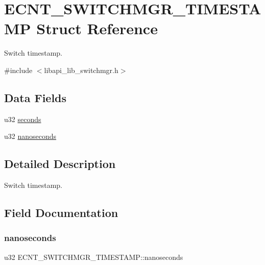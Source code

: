 \hypertarget{structECNT__SWITCHMGR__TIMESTAMP}{}\section{E\+C\+N\+T\+\_\+\+S\+W\+I\+T\+C\+H\+M\+G\+R\+\_\+\+T\+I\+M\+E\+S\+T\+A\+MP Struct Reference}
\label{structECNT__SWITCHMGR__TIMESTAMP}


Switch timestamp.  




{\ttfamily \#include $<$libapi\+\_\+lib\+\_\+switchmgr.\+h$>$}

\subsection*{Data Fields}
\begin{DoxyCompactItemize}
\item 
u32 \hyperlink{structECNT__SWITCHMGR__TIMESTAMP_a2c5cee3b4ad5512016711cd0f1ba4a4b}{seconds}
\item 
u32 \hyperlink{structECNT__SWITCHMGR__TIMESTAMP_a0fbab29a565d9a158125ef32ef83a29f}{nanoseconds}
\end{DoxyCompactItemize}


\subsection{Detailed Description}
Switch timestamp. 

\subsection{Field Documentation}
\mbox{\label{structECNT__SWITCHMGR__TIMESTAMP_a0fbab29a565d9a158125ef32ef83a29f}} 
\subsubsection{\texorpdfstring{nanoseconds}{nanoseconds}}
{\footnotesize\ttfamily u32 E\+C\+N\+T\+\_\+\+S\+W\+I\+T\+C\+H\+M\+G\+R\+\_\+\+T\+I\+M\+E\+S\+T\+A\+M\+P\+::nanoseconds}

